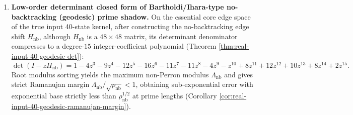 \begin{enumerate}
  \item \textbf{Low-order determinant closed form of Bartholdi/Ihara-type no-backtracking (geodesic) prime shadow.}
  On the essential core edge space of the true input 40-state kernel, after constructing the no-backtracking edge shift \(H_{\mathrm{nb}}\), although \(H_{\mathrm{nb}}\) is a \(48\times48\) matrix, its determinant denominator compresses to a degree-\(15\) integer-coefficient polynomial (Theorem \ref{thm:real-input-40-geodesic-det}):
  \[
  \det(I-zH_{\mathrm{nb}})
  =1-4z^3-9z^4-12z^5-16z^6-11z^7-11z^8-4z^9-z^{10}
  +8z^{11}+12z^{12}+10z^{13}+8z^{14}+2z^{15}.
  \]
  Root modulus sorting yields the maximum non-Perron modulus \(\Lambda_{\mathrm{nb}}\) and gives strict Ramanujan margin \(\Lambda_{\mathrm{nb}}/\sqrt{\rho_{\mathrm{nb}}}<1\), obtaining sub-exponential error with exponential base strictly less than \(\rho_{\mathrm{nb}}^{1/2}\) at prime lengths (Corollary \ref{cor:real-input-40-geodesic-ramanujan-margin}).
\end{enumerate}

